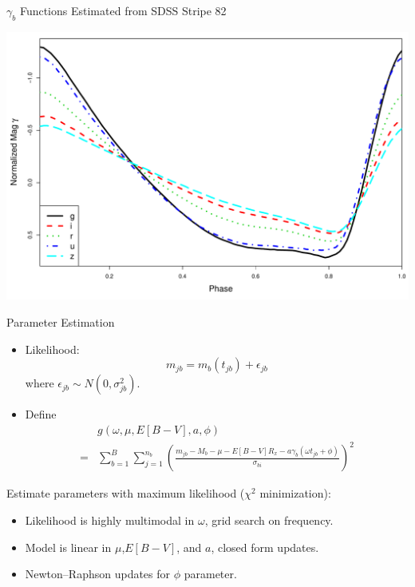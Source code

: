 \documentclass[12pt]{beamer}
\begin{document}
\begin{frame}{$\gamma_b$ Functions Estimated from SDSS Stripe 82}

\begin{center}
\includegraphics[scale=.3]{figs/templates.pdf}
\end{center}

\end{frame}


\begin{frame}{Parameter Estimation}
\begin{itemize}
\item Likelihood:
\begin{equation*}
m_{jb} = m_b(t_{jb}) + \epsilon_{jb} 
\end{equation*}
where $\epsilon_{jb} \sim N(0,\sigma_{jb}^2)$.
\item Define
\begin{align*}
&g(\omega,\mu,E[B-V],a,\phi) \\
= &\sum_{b=1}^B \sum_{j=1}^{n_b}\left(\frac{m_{jb} - M_b - \mu - E[B-V]R_x - a\gamma_b(\omega t_{jb} + \phi)}{\sigma_{bi}}\right)^2
\end{align*}
\end{itemize}

Estimate parameters with maximum likelihood ($\chi^2$ minimization):
\begin{itemize}
\item Likelihood is highly multimodal in $\omega$, grid search on frequency.
\item Model is linear in $\mu$,$E[B-V]$, and $a$, closed form updates.
\item Newton--Raphson updates for $\phi$ parameter.
\end{itemize}

\end{frame}
\end{document}
